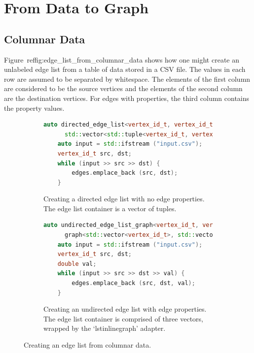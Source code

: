 \section{From Data to Graph}

\subsection{Columnar Data}

Figure~ref{fig:edge\_list\_from\_columnar\_data}
shows how one might create an unlabeled edge list from a table of data stored in a CSV file.
The values in each row are assumed to be separated by whitespace.
The elements of the first column are considered to be the source vertices and the elements of
the second column are the destination vertices. For edges with properties, the third column
contains the property values.

\begin{figure}[ht]
  \begin{center}
    \begin{subfigure}{0.48\textwidth}
      \begin{lstlisting}[language=C++]
    auto directed_edge_list<vertex_id_t, vertex_id_t>
      std::vector<std::tuple<vertex_id_t, vertex_id_t> edges;
    auto input = std::ifstream ("input.csv");
    vertex_id_t src, dst;
    while (input >> src >> dst) {
        edges.emplace_back (src, dst);
    }
      \end{lstlisting}
      \caption{Creating a directed edge list with no edge properties.
      The edge list container is a vector of tuples.
      \label{subfig:edge_list_no_properties}}
    \end{subfigure}
    \begin{subfigure}{0.48\textwidth}
      \begin{lstlisting}[language=C++]
    auto undirected_edge_list_graph<vertex_id_t, vertex_id_t, double>
      graph<std::vector<vertex_id_t>, std::vector<vertex_id_t>, std::vector<double>> edges;
    auto input = std::ifstream ("input.csv");
    vertex_id_t src, dst;
    double val;
    while (input >> src >> dst >> val) {
        edges.emplace_back (src, dst, val);
    }
      \end{lstlisting}
      \caption{Creating an undirected edge list with edge properties.
      The edge list container is comprised of three vectors, wrapped by
      the `lstinline{graph}' adapter.
      \label{subfig:edge_list_with_properties}}
    \end{subfigure}
    \caption{Creating an edge list from columnar data.\label{fig:edge_list_from_columnar_data}}
  \end{center}
\end{figure}

